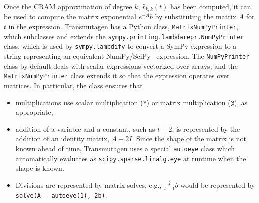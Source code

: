 Once the CRAM approximation of degree $k$, $\hat{r}_{k, k}(t)$ has been
computed, it can be used to compute the matrix exponential $e^{-A}b$ by
substituting the matrix $A$ for $t$ in the expression. Transmutagen has a
Python class, \texttt{MatrixNumPyPrinter}, which subclasses and extends the
\texttt{sympy.printing.lambdarepr.NumPyPrinter} class, which is used by
\texttt{sympy.lambdify} to convert a SymPy expression to a string representing
an equivalent NumPy/SciPy~\cite{ationneeded} expression. The
\texttt{NumPyPrinter} class by default deals with scalar expressions
vectorized over arrays, and the \texttt{MatrixNumPyPrinter} class extends it
so that the expression operates over matrices. In particular, the class
ensures that

\begin{itemize}
\item multiplications use scalar multiplication (\texttt{*}) or
  matrix multiplication (\texttt{@}), as appropriate,
\item addition of a variable and a constant, such as $t + 2$, is represented
  by the addition of an identity matrix, $A + 2I$. Since the shape of the
  matrix is not known ahead of time, Transmutagen uses a special
  \texttt{autoeye} class which automatically evaluates as \texttt{scipy.sparse.linalg.eye} at runtime when the shape is known.
\item Divisions are represented by matrix solves, e.g., $\frac{2}{t - 1}b$
  would be represented by \texttt{solve(A - autoeye(1), 2b)}.
\end{itemize}
